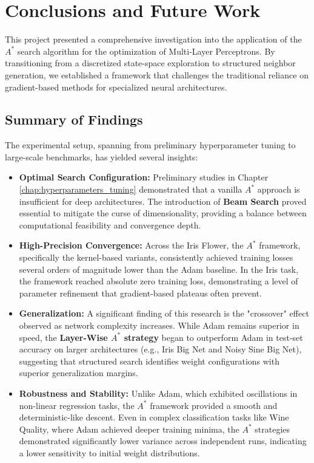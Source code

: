 \chapter{Conclusions and Future Work}
\label{chap:conclusions}

This project presented a comprehensive investigation into the application of the $A^*$ search algorithm for the optimization of Multi-Layer Perceptrons. By transitioning from a discretized state-space exploration to structured neighbor generation, we established a framework that challenges the traditional reliance on gradient-based methods for specialized neural architectures.

\section{Summary of Findings}

The experimental setup, spanning from preliminary hyperparameter tuning to large-scale benchmarks, has yielded several insights:

\begin{itemize}
    \item \textbf{Optimal Search Configuration:} Preliminary studies in Chapter \ref{chap:hyperparameters_tuning} demonstrated that a vanilla $A^*$ approach is insufficient for deep architectures. The introduction of \textbf{Beam Search} proved essential to mitigate the curse of dimensionality, providing a balance between computational feasibility and convergence depth.
    
    \item \textbf{High-Precision Convergence:} Across the Iris Flower, the $A^*$ framework, specifically the kernel-based variants, consistently achieved training losses several orders of magnitude lower than the Adam baseline. In the Iris task, the framework reached absolute zero training loss, demonstrating a level of parameter refinement that gradient-based plateaus often prevent.
    
    \item \textbf{Generalization:} A significant finding of this research is the "crossover" effect observed as network complexity increases. While Adam remains superior in speed, the \textbf{Layer-Wise $A^*$ strategy} began to outperform Adam in test-set accuracy on larger architectures (e.g., Iris Big Net and Noisy Sine Big Net), suggesting that structured search identifies weight configurations with superior generalization margins.
    
    \item \textbf{Robustness and Stability:} Unlike Adam, which exhibited oscillations in non-linear regression tasks, the $A^*$ framework provided a smooth and deterministic-like descent. Even in complex classification tasks like Wine Quality, where Adam achieved deeper training minima, the $A^*$ strategies demonstrated significantly lower variance across independent runs, indicating a lower sensitivity to initial weight distributions.
\end{itemize}



